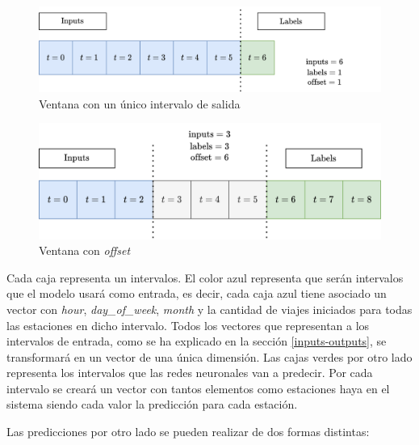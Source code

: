 \begin{figure}[H]
    \centering
    \includegraphics[width=12cm]{images/solution/modules/windows/windows-2.png}
    \caption{Ventana con un único intervalo de salida}
\end{figure}



\begin{figure}[H]
    \centering
    \includegraphics[width=12cm]{images/solution/modules/windows/windows-3.png}
    \caption{Ventana con \textit{offset}}
\end{figure}

Cada caja representa un intervalos. El color azul representa que serán intervalos que el modelo usará como entrada, es decir, cada caja azul tiene asociado un vector con \textit{hour}, \textit{day\_of\_week}, \textit{month} y la cantidad de viajes iniciados para todas las estaciones en dicho intervalo. Todos los vectores que representan a los intervalos de entrada, como se ha explicado en la sección \ref{inputs-outputs}, se transformará en un vector de una única dimensión. Las cajas verdes por otro lado representa los intervalos que las redes neuronales van a predecir. Por cada intervalo se creará un vector con tantos elementos como estaciones haya en el sistema siendo cada valor la predicción para cada estación.
\newline


Las predicciones por otro lado se pueden realizar de dos formas distintas:

